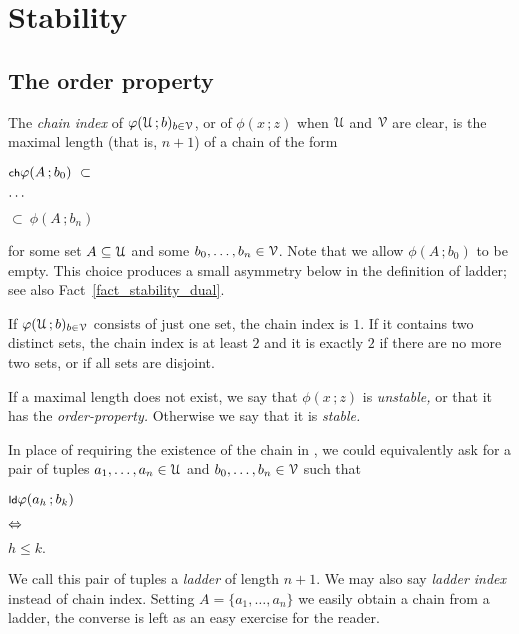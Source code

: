 \documentclass[scombinatorics.tex]{subfiles}
\begin{document}
\chapter{Stability}
\label{sauer}



\def\medrel#1{\parbox[t]{5ex}{$\displaystyle\hfil #1$}}
\def\ceq#1#2#3{\parbox[t]{20ex}{$\displaystyle #1$}\medrel{#2}{$\displaystyle #3$}}


\section{The order property}\label{ladder}

The \emph{chain index\/} of $\varphi(\EuScript U\,;b)_{b\in\EuScript V}$, or of $\phi(x\,;z)$ when $\EuScript U$ and $\EuScript V$ are clear, is the maximal length (that is, $n+1$) of a chain of the form

\ceq{\ssf{ch}\hfill\phi(A\,;b_0)\ \subset}{\dots}{\subset\ \phi(A\,;b_n)}

for some set $A\subseteq\EuScript U$ and some $b_0,\dots,b_n\in\EuScript V$.
Note that we allow $\phi(A\,;b_0)$ to be empty.
This choice produces a small asymmetry below in the definition of ladder; see also Fact~\ref{fact_stability_dual}.

\begin{example}
  If $\varphi(\EuScript U\,;b)_{b\in\EuScript V}$ consists of just one set, the chain index is $1$.
  If it contains two distinct sets, the  chain index is at least $2$ and it is exactly $2$ if there are no more two sets, or if all sets are disjoint.\QED
\end{example}

If a maximal length does not exist, we say that $\phi(x\,;z)$ is \emph{unstable,} or that it has the \emph{order-property.} 
Otherwise we say that it is \emph{stable.}

In place of requiring the existence of the chain in , we could equivalently ask for a pair of tuples $a_1,\dots,a_n\in\EuScript U$ and $b_0,\dots,b_n\in\EuScript V$ such that

\ceq{\ssf{ld}\hfill\phi(a_h\,;b_k)}
{\IFF}
{h\le k.}

We call this pair of tuples a \emph{ladder\/} of length $n+1$.
We may also say \emph{ladder index\/} instead of chain index.
Setting $A=\{a_1,\dots,a_n\}$ we easily obtain a chain from a ladder, the converse is left as an easy exercise for the reader.
\end{document}
